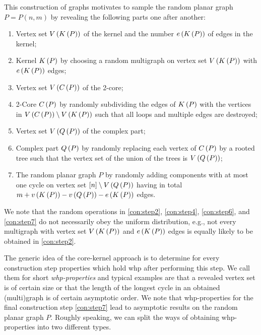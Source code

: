 This construction of graphs motivates to sample the random planar graph $P=P(n,m)$ by revealing the following parts one after another:
\begin{enumerate}[label={(C\arabic*)}]
    \item\label{con:step1} Vertex set $V\left(K\left(P\right)\right)$ of the kernel and the number $e\left({K\left(P\right)}\right)$ of edges in the kernel;
    \item\label{con:step2} Kernel $K\left(P\right)$ by choosing a random multigraph on vertex set $V\left(K\left(P\right)\right)$ with $e\left({K\left(P\right)}\right)$ edges;
    \item\label{con:step3} Vertex set $V\left(C\left(P\right)\right)$ of the 2-core;
    \item\label{con:step4} 2-Core $C\left(P\right)$ by randomly subdividing the edges of $K\left(P\right)$ with the vertices in $V\left(C\left(P\right)\right)\setminus V\left(K\left(P\right)\right)$ such that all loops and multiple edges are destroyed;
    \item\label{con:step5} Vertex set $V\left(Q\left(P\right)\right)$ of the complex part;
    \item\label{con:step6} Complex part $Q\left(P\right)$ by randomly replacing each vertex of $C\left(P\right)$ by a rooted tree such that the vertex set of the union of the trees is $V\left(Q\left(P\right)\right)$;
    \item\label{con:step7} The random planar graph $P$ by randomly adding components with at most one cycle on vertex set $[n]\setminus V\left(Q\left(P\right)\right)$
    having in total $m+v\left({K\left(P\right)}\right)-v\left({Q\left(P\right)}\right)-e\left({K\left(P\right)}\right)$ edges.
\end{enumerate}

We note that the random operations in \ref{con:step2}, \ref{con:step4}, \ref{con:step6}, and \ref{con:step7} do not necessarily obey the uniform distribution, e.g., not every multigraph with vertex set $V\left(K\left(P\right)\right)$ and $e\left({K\left(P\right)}\right)$ edges is equally likely to be obtained in \ref{con:step2}.

The generic idea of the core-kernel approach is to determine for every construction step properties which hold whp after performing this step. We call them for short {\em whp-properties} and typical examples are that a revealed vertex set is of certain size or that the length of the longest cycle in an obtained (multi)graph is of certain asymptotic order. We note that whp-properties for the final construction step \ref{con:step7} lead to asymptotic results on the random planar graph $P$. Roughly speaking, we can split the ways of obtaining whp-properties into two different types.

